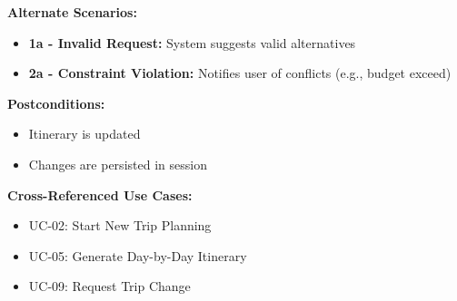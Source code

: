 \documentclass[12pt,a4paper]{article}
\begin{document}
\vspace{0.3em}
\textbf{Alternate Scenarios:}

\begin{itemize}[leftmargin=1.5cm, itemsep=0.3em]
    \item \textbf{1a - Invalid Request:} System suggests valid alternatives
    \item \textbf{2a - Constraint Violation:} Notifies user of conflicts (e.g., budget exceed)
\end{itemize}

\vspace{0.3em}
\textbf{Postconditions:}

\begin{itemize}[leftmargin=1.5cm, itemsep=0.3em]
    \item Itinerary is updated
    \item Changes are persisted in session
\end{itemize}

\vspace{0.3em}
\textbf{Cross-Referenced Use Cases:}

\begin{itemize}[leftmargin=1.5cm, itemsep=0.3em]
    \item UC-02: Start New Trip Planning
    \item UC-05: Generate Day-by-Day Itinerary
    \item UC-09: Request Trip Change
\end{itemize}

\newpage
\end{document}
